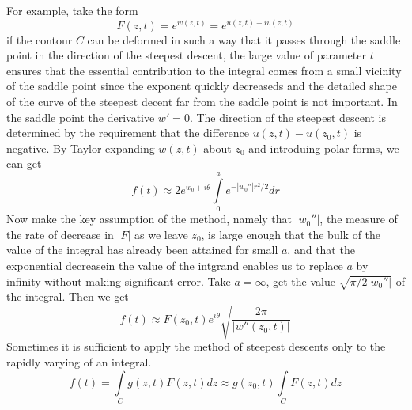 \documentclass[11pt,a4paper,sans]{moderncv}        %
\begin{document}
\vspace{0.2cm}
For example, take the form 
\begin{equation*}
	F(z,t) = e^{w(z,t)} = e^{u(z,t) + iv(z,t)}
\end{equation*}
if the contour $C$ can be deformed in such a way that it passes through the saddle point in the direction of the steepest descent, 
the large value of parameter $t$ ensures that the essential contribution to the integral comes from a small vicinity of the saddle point since the exponent quickly decreaseds and the detailed shape of the curve of the steepest decent far from the saddle point is not important. 
In the saddle point the derivative $w' = 0$. The direction of the steepest descent is determined by the requirement that the difference $u(z,t) - u(z_{0},t)$ is negative. By Taylor expanding $w(z,t)$ about $z_{0}$ and introduing polar forms, we can get 
\begin{equation*}
	f(t) \approx 2e^{w_{0} + i\theta}\int\limits^{a}_{0} e^{-|w_{0}''|r^2/2} dr
\end{equation*}
Now make the key assumption of the method, namely that $|w_{0}''|$, 
the measure of the rate of decrease in $|F|$ as we leave $z_{0}$, 
is large enough that the bulk of the value of the integral has already been attained for small $a$, 
and that the exponential decreasein the value of the intgrand enables us to replace $a$ by infinity without making significant error. 
Take $a = \infty$, get the value $\sqrt{\pi/2|w_{0}''|}$ of the integral. Then we get
\begin{equation*}
	f(t) \approx F(z_{0},t)e^{i\theta}\sqrt{\frac{2\pi}{|w''(z_{0},t)|}}
\end{equation*}
\vspace{0.2cm}
Sometimes it is sufficient to apply the method of steepest descents only to the rapidly varying of an integral. 
\begin{equation*}
	f(t) = \int\limits_{C} g(z,t)F(z,t)dz \approx g(z_{0},t)\int\limits_{C} F(z,t)dz
\end{equation*}
\end{document}
